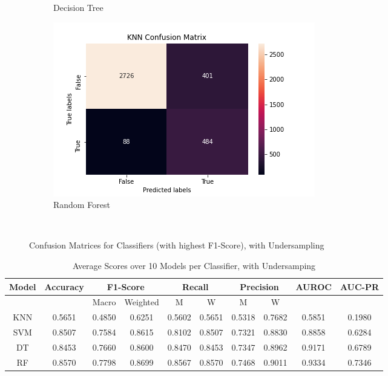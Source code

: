 \documentclass{article}
\begin{document}
\begin{figure}[H]
\begin{subfigure}{.5\linewidth}
\caption{Decision Tree}
\label{fig:dtMatrix_under}
\end{subfigure}%
\begin{subfigure}{.5\linewidth}
\centering
\includegraphics[scale=0.4]{RandomForest_under_confusionMatrix.png}
\caption{Random Forest}
\label{fig:rfMatrix_under}
\end{subfigure}\\[1ex]
\caption{Confusion Matrices for Classifiers (with highest F1-Score), with Undersampling}
\label{fig:confusionMatrix_under}
\end{figure}

\begin{table}[H]
\centering
\begin{tabular}{| c || c | c | c | c | c | c | c | c | c |} 
\hline 
 Model & Accuracy & \multicolumn{2}{|c|}{F1-Score} & \multicolumn{2}{|c|}{Recall} & \multicolumn{2}{|c|}{Precision} & AUROC & AUC-PR \\ \hline
 &  & Macro & Weighted & M & W & M & W & &    \\ \hline 
\hline\hline
KNN &  \cellcolor{red!25}0.5651 & \cellcolor{red!25}0.4850 & \cellcolor{red!25}0.6251 & \cellcolor{red!25}0.5602 & \cellcolor{red!25}0.5651 & \cellcolor{red!25}0.5318 & \cellcolor{red!25}0.7682 & \cellcolor{red!25}0.5851 & \cellcolor{red!25}0.1980  \\ \hline 
SVM &  0.8507 & 0.7584 & 0.8615 & 0.8102 & 0.8507 & 0.7321 & 0.8830 & 0.8858 & 0.6284  \\ \hline 
DT &  0.8453 & 0.7660 & 0.8600 & 0.8470 & 0.8453 & 0.7347 & 0.8962 & 0.9171 & 0.6789  \\ \hline 
RF &  \cellcolor{green!25}0.8570 & \cellcolor{green!25}0.7798 & \cellcolor{green!25}0.8699 & \cellcolor{green!25}0.8567 & \cellcolor{green!25}0.8570 & \cellcolor{green!25}0.7468 & \cellcolor{green!25}0.9011 & \cellcolor{green!25}0.9334 & \cellcolor{green!25}0.7346  \\ \hline 
\end{tabular}
\caption{Average Scores over 10 Models per Classifier, with Undersamping}
\label{tab:scores_under}
\end{table}
\end{document}
